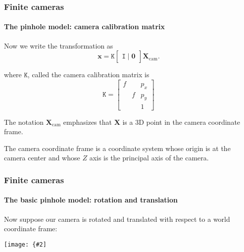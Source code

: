\documentclass[aspectratio=169]{beamer}
\renewcommand{\vec}[1]{\boldsymbol{#1}}
\newcommand{\mat}[1]{\mathtt{#1}}
\newcommand{\myfig}[3]{\centerline{\texttt{[image: \{\#2]}}}
    \centerline{\scriptsize #3}}
\begin{document}
\begin{frame}
\frametitle{Finite cameras}
\framesubtitle{The pinhole model: camera calibration matrix}

Now we write the transformation as
\begin{equation*}
\vec{x} = \mat{K}
\begin{bmatrix} \mat{I} \mid \vec{0} \end{bmatrix}
\vec{X}_{\text{cam}}.
\end{equation*}

where $\mat{K}$, called the \alert{camera calibration matrix} is
\begin{equation*}
\mat{K} = \begin{bmatrix} f & & p_x \\ & f & p_y \\ & & 1
\end{bmatrix}
\end{equation*}

\medskip

The notation $\vec{X}_{\text{cam}}$ emphasizes that $\vec{X}$ is a 3D
point in the \alert{camera coordinate frame}.

\medskip

The camera coordinate frame is a coordinate system whose origin is at
the camera center and whose $Z$ axis is the principal axis of the
camera.

\end{frame}

\begin{frame}
\frametitle{Finite cameras}
\framesubtitle{The basic pinhole model: rotation and translation}

Now suppose our camera is rotated and translated with respect to a
\alert{world coordinate frame}:

\medskip

\myfig{4in}{HZ-fig5-3}{Hartley and Zisserman (2004), Fig.\ 5.3}

\end{frame}
\end{document}
